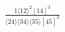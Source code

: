 \documentclass[varwidth, border=5pt]{standalone}
\begin{document}
\begin{my}
$\begin{gathered}
\scriptscriptstyle\frac{1⟨12⟩^2[14]^3}{⟨24⟩⟨34⟩⟨35⟩[45]^3}
\end{gathered}$
\end{my}
\end{document}
